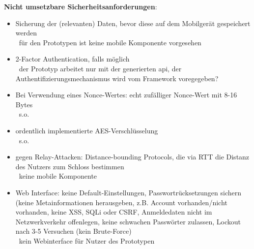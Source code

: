     \medskip
    \noindent \textbf{Nicht umsetzbare Sicherheitsanforderungen}:
    \begin{itemize}[noitemsep]
        \item Sicherung der (relevanten) Daten, bevor diese auf dem Mobilgerät gespeichert werden\cite{Ye2017}\\
            \textrightarrow\ für den Prototypen ist keine mobile Komponente vorgesehen
        \item 2-Factor Authentication, falls möglich\cite{Rose2016,Miessler2015}\\
            \textrightarrow\ der Prototyp arbeitet nur mit der generierten \gls{api}, der Authentifizierungsmechanismus wird vom Framework voregegeben?
        \item Bei Verwendung eines Nonce-Wertes: echt zufälliger Nonce-Wert mit 8-16 Bytes\cite{Rose2016}\\
            \textrightarrow\ s.o.
        \item ordentlich implementierte AES-Verschlüsselung\cite{Rose2016}\\
            \textrightarrow\ s.o.
        \item gegen Relay-Attacken: Distance-bounding Protocols, die via RTT die Distanz des Nutzers zum Schloss bestimmen\cite{Ho2016}\\ 
            \textrightarrow\ keine mobile Komponente
        \item Web Interface: keine Default-Einstellungen, Passwortrücksetzungen sichern (keine Metainformationen herausgeben, z.B. Account vorhanden/\-nicht vorhanden, keine XSS, SQLi oder CSRF, Anmeldedaten nicht im Netzwerkverkehr offenlegen, keine schwachen Passwörter zulassen, Lockout nach 3-5 Versuchen (kein Brute-Force)\cite{Miessler2015}\\
            \textrightarrow\ kein Webinterface für Nutzer des Prototypen
    \end{itemize}
    